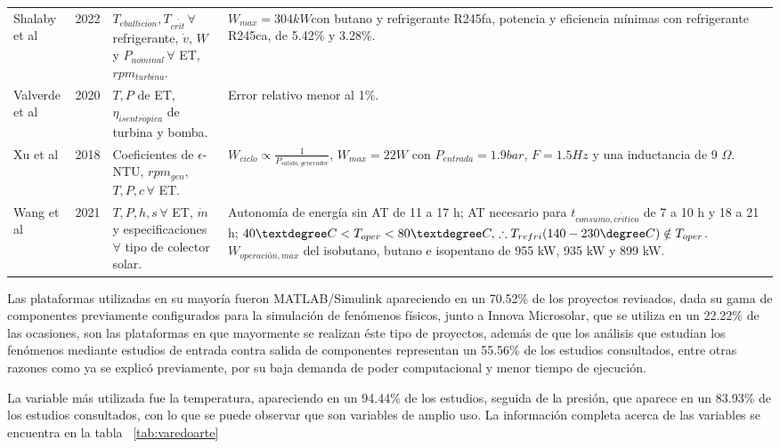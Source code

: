 {\begin{footnotesize}
\begin{longtable}[H]{p{1.5cm}p{0.5cm}p{4cm}p{9.3cm}}
        Shalaby et al & 2022 &
        $T_{ebullici\acute{o}n}, T_{cr\acute{i}t}\,\forall$ refrigerante, $\dot{v}$, $W$ y $P_{nominal}\,\forall$ ET, $rpm_{turbina}$. & 
        $W_{max}=304 kW $con butano y refrigerante R245fa, potencia y eficiencia mínimas con refrigerante R245ca, de 5.42\% y 3.28\%. \\
        Valverde et al & 2020 &
        $T,P$ de ET, $\eta_{isentr\acute{o}pica}$ de turbina y bomba. & 
        Error relativo menor al 1\%. \\
        Xu et al & 2018 & 
        Coeficientes de $\epsilon$-NTU, $rpm_{gen}$, $T,P,c\, \forall$ ET. & 
        $W_{ciclo} \propto \frac{1}{P_{salida,generador}}$, $W_{max}=22W$ con $P_{entrada}=1.9bar$, $F=1.5 Hz$ y una inductancia de 9 $\Omega$. \\
        Wang et al & 2021 &
        $T,P,h,s\,\forall$ ET, $\dot{m}$ y especificaciones $\forall$ tipo de colector solar. &
        Autonomía de energía sin AT de 11 a 17 h; AT necesario para $t_{consumo,cr\acute{i}tico}$ de 7 a 10 h y 18 a 21 h; $40°C<T_{oper}<80°C,\, \therefore T_{refri} (140-230\degree C) \notin T_{oper}$. $W_{operación,max}$ del isobutano, butano e isopentano de 955 kW, 935 kW y 899 kW. \\
        \hline

\end{longtable}

\end{footnotesize}
}
\doublespacing


Las plataformas utilizadas en su mayoría fueron MATLAB/Simulink apareciendo en un 70.52\% de los proyectos revisados, dada su gama de componentes previamente configurados para la simulación de fenómenos físicos, junto a Innova Microsolar, que se utiliza en un 22.22\% de las ocasiones, son las plataformas en que mayormente se realizan éste tipo de proyectos, además de que los análisis que estudian los fenómenos mediante estudios de entrada contra salida de componentes representan un 55.56\% de los estudios consultados, entre otras razones como ya se explicó previamente, por su baja demanda de poder computacional y menor tiempo de ejecución.

La variable más utilizada fue la temperatura, apareciendo en un 94.44\% de los estudios, seguida de la presión, que aparece en un 83.93\% de los estudios consultados, con lo que se puede observar que son variables de amplio uso. La información completa acerca de las variables se encuentra en la tabla ~\ref{tab:varedoarte}

